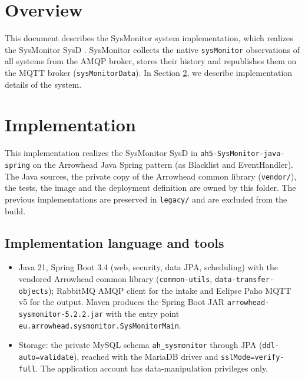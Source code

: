 \documentclass[a4paper]{arrowhead}
\begin{document}
\section{Overview}
\label{sec:overview}

This document describes the SysMonitor system implementation, which realizes the SysMonitor SysD \cite{smo-sysd}. SysMonitor collects the native \texttt{sysMonitor} observations of all systems from the AMQP broker, stores their history and republishes them on the MQTT broker (\texttt{sysMonitorData}).
In Section \ref{Implementation}, we describe implementation details of the system.

\newpage

\section{Implementation}
\label{Implementation}

This implementation realizes the SysMonitor SysD in \texttt{ah5-\allowbreak{}SysMonitor-\allowbreak{}java-\allowbreak{}spring} on the Arrowhead Java Spring pattern (as Blacklist and EventHandler). The Java sources, the private copy of the Arrowhead common library (\texttt{vendor/}), the tests, the image and the deployment definition are owned by this folder. The previous implementations are preserved in \texttt{legacy/\allowbreak{}} and are excluded from the build.

\subsection{Implementation language and tools}
\begin{itemize}
\item Java 21, Spring Boot 3.4 (web, security, data JPA, scheduling) with the vendored Arrowhead common library (\texttt{common-\allowbreak{}utils}, \texttt{data-\allowbreak{}transfer-\allowbreak{}objects}); RabbitMQ AMQP client for the intake and Eclipse Paho MQTT v5 for the output. Maven produces the Spring Boot JAR \texttt{arrowhead-\allowbreak{}sysmonitor-\allowbreak{}5.2.2.jar} with the entry point \texttt{eu.\allowbreak{}arrowhead.\allowbreak{}sysmonitor.\allowbreak{}SysMonitorMain}.
\item Storage: the private MySQL schema \texttt{ah\_\allowbreak{}sysmonitor} through JPA (\texttt{ddl-\allowbreak{}auto=validate}), reached with the MariaDB driver and \texttt{sslMode=\allowbreak{}verify-\allowbreak{}full}. The application account has data-manipulation privileges only.
\end{itemize}
\end{document}
